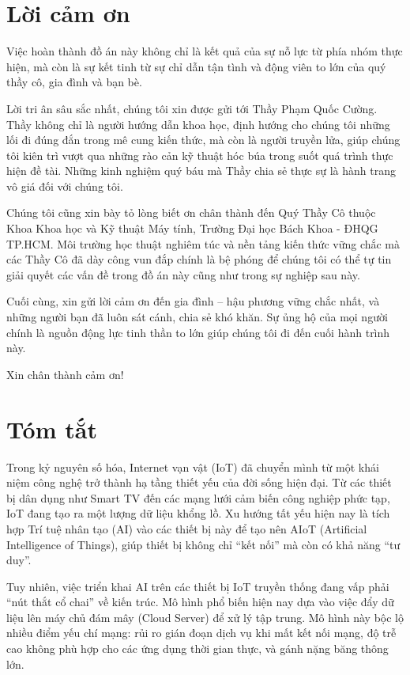 \chapter{Lời cảm ơn}

Việc hoàn thành đồ án này không chỉ là kết quả của sự nỗ lực từ phía nhóm thực hiện, mà còn là sự kết tinh từ sự chỉ dẫn tận tình và động viên to lớn của quý thầy cô, gia đình và bạn bè.

Lời tri ân sâu sắc nhất, chúng tôi xin được gửi tới Thầy Phạm Quốc Cường. Thầy không chỉ là người hướng dẫn khoa học, định hướng cho chúng tôi những lối đi đúng đắn trong mê cung kiến thức, mà còn là người truyền lửa, giúp chúng tôi kiên trì vượt qua những rào cản kỹ thuật hóc búa trong suốt quá trình thực hiện đề tài. Những kinh nghiệm quý báu mà Thầy chia sẻ thực sự là hành trang vô giá đối với chúng tôi.

Chúng tôi cũng xin bày tỏ lòng biết ơn chân thành đến Quý Thầy Cô thuộc Khoa Khoa học và Kỹ thuật Máy tính, Trường Đại học Bách Khoa - ĐHQG TP.HCM. Môi trường học thuật nghiêm túc và nền tảng kiến thức vững chắc mà các Thầy Cô đã dày công vun đắp chính là bệ phóng để chúng tôi có thể tự tin giải quyết các vấn đề trong đồ án này cũng như trong sự nghiệp sau này.

Cuối cùng, xin gửi lời cảm ơn đến gia đình – hậu phương vững chắc nhất, và những người bạn đã luôn sát cánh, chia sẻ khó khăn. Sự ủng hộ của mọi người chính là nguồn động lực tinh thần to lớn giúp chúng tôi đi đến cuối hành trình này.

Xin chân thành cảm ơn!

\chapter{Tóm tắt}

Trong kỷ nguyên số hóa, Internet vạn vật (IoT) đã chuyển mình từ một khái niệm công nghệ trở thành hạ tầng thiết yếu của đời sống hiện đại. Từ các thiết bị dân dụng như Smart TV đến các mạng lưới cảm biến công nghiệp phức tạp, IoT đang tạo ra một lượng dữ liệu khổng lồ. Xu hướng tất yếu hiện nay là tích hợp Trí tuệ nhân tạo (AI) vào các thiết bị này để tạo nên AIoT (Artificial Intelligence of Things), giúp thiết bị không chỉ ``kết nối'' mà còn có khả năng ``tư duy''.

Tuy nhiên, việc triển khai AI trên các thiết bị IoT truyền thống đang vấp phải ``nút thắt cổ chai'' về kiến trúc. Mô hình phổ biến hiện nay dựa vào việc đẩy dữ liệu lên máy chủ đám mây (Cloud Server) để xử lý tập trung. Mô hình này bộc lộ nhiều điểm yếu chí mạng: rủi ro gián đoạn dịch vụ khi mất kết nối mạng, độ trễ cao không phù hợp cho các ứng dụng thời gian thực, và gánh nặng băng thông lớn.

